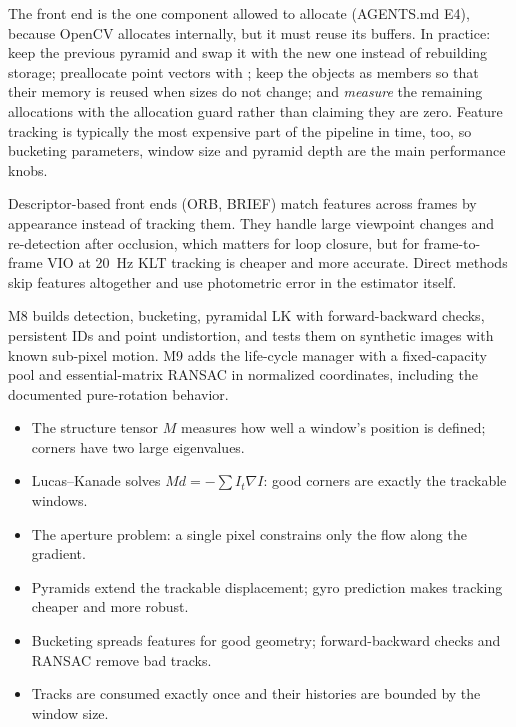 The front end is the one component allowed to allocate (AGENTS.md E4), because OpenCV allocates internally, but it
must reuse its buffers. In practice: keep the previous pyramid and swap it with the new one instead of rebuilding
storage; preallocate point vectors with ; keep the  objects as members so that their memory is
reused when sizes do not change; and \emph{measure} the remaining allocations with the allocation guard rather than
claiming they are zero. Feature tracking is typically the most expensive part of the pipeline in time, too, so bucketing
parameters, window size and pyramid depth are the main performance knobs.

Descriptor-based front ends (ORB, BRIEF) match features across frames by appearance instead of tracking them. They
handle large viewpoint changes and re-detection after occlusion, which matters for loop closure, but for frame-to-frame
VIO at 20~Hz KLT tracking is cheaper and more accurate. Direct methods skip features altogether and use photometric
error in the estimator itself.

\begin{projectlink}
M8 builds detection, bucketing, pyramidal LK with forward-backward checks, persistent IDs and point undistortion, and
tests them on synthetic images with known sub-pixel motion. M9 adds the life-cycle manager with a fixed-capacity pool
and essential-matrix RANSAC in normalized coordinates, including the documented pure-rotation behavior.
\end{projectlink}

\begin{takeaways}
\begin{itemize}
  \item The structure tensor $M$ measures how well a window's position is defined; corners have two large eigenvalues.
  \item Lucas--Kanade solves $Md = -\sum I_t\nabla I$: good corners are exactly the trackable windows.
  \item The aperture problem: a single pixel constrains only the flow along the gradient.
  \item Pyramids extend the trackable displacement; gyro prediction makes tracking cheaper and more robust.
  \item Bucketing spreads features for good geometry; forward-backward checks and RANSAC remove bad tracks.
  \item Tracks are consumed exactly once and their histories are bounded by the window size.
\end{itemize}
\end{takeaways}

